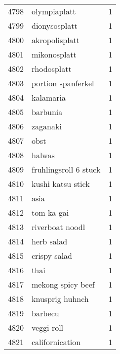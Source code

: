 \begin{tabular}{llr}
4798 &                                       olympiaplatt &      1 \\
4799 &                                      dionysosplatt &      1 \\
4800 &                                     akropolisplatt &      1 \\
4801 &                                       mikonosplatt &      1 \\
4802 &                                        rhodosplatt &      1 \\
4803 &                                 portion spanferkel &      1 \\
4804 &                                          kalamaria &      1 \\
4805 &                                           barbunia &      1 \\
4806 &                                           zaganaki &      1 \\
4807 &                                               obst &      1 \\
4808 &                                             halwas &      1 \\
4809 &                              fruhlingsroll 6 stuck &      1 \\
4810 &                                  kushi katsu stick &      1 \\
4811 &                                               asia &      1 \\
4812 &                                         tom ka gai &      1 \\
4813 &                                    riverboat noodl &      1 \\
4814 &                                         herb salad &      1 \\
4815 &                                       crispy salad &      1 \\
4816 &                                               thai &      1 \\
4817 &                                  mekong spicy beef &      1 \\
4818 &                                    knusprig huhnch &      1 \\
4819 &                                            barbecu &      1 \\
4820 &                                         veggi roll &      1 \\
4821 &                                    californication &      1 \\

\end{tabular}
